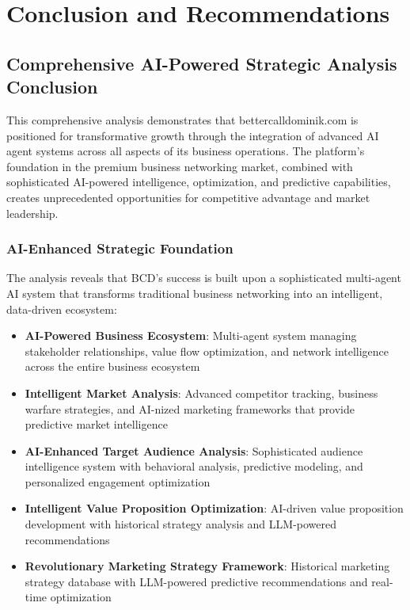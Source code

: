 \chapter{Conclusion and Recommendations}

\section{Comprehensive AI-Powered Strategic Analysis Conclusion}

This comprehensive analysis demonstrates that bettercalldominik.com is positioned for transformative growth through the integration of advanced AI agent systems across all aspects of its business operations. The platform's foundation in the premium business networking market, combined with sophisticated AI-powered intelligence, optimization, and predictive capabilities, creates unprecedented opportunities for competitive advantage and market leadership.

\subsection{AI-Enhanced Strategic Foundation}

The analysis reveals that BCD's success is built upon a sophisticated multi-agent AI system that transforms traditional business networking into an intelligent, data-driven ecosystem:

\begin{itemize}
    \item \textbf{AI-Powered Business Ecosystem}: Multi-agent system managing stakeholder relationships, value flow optimization, and network intelligence across the entire business ecosystem
    \item \textbf{Intelligent Market Analysis}: Advanced competitor tracking, business warfare strategies, and AI-nized marketing frameworks that provide predictive market intelligence
    \item \textbf{AI-Enhanced Target Audience Analysis}: Sophisticated audience intelligence system with behavioral analysis, predictive modeling, and personalized engagement optimization
    \item \textbf{Intelligent Value Proposition Optimization}: AI-driven value proposition development with historical strategy analysis and LLM-powered recommendations
    \item \textbf{Revolutionary Marketing Strategy Framework}: Historical marketing strategy database with LLM-powered predictive recommendations and real-time optimization
\end{itemize}

